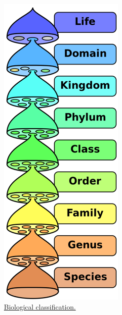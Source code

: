 \begin{figure}

{\centering \includegraphics[width=0.7\linewidth]{./figures/systematics/biological_classification} 

}

\caption{\href{https://commons.wikimedia.org/wiki/File:Biological_classification_L_Pengo_vflip.svg}{Biological classification.}}\label{fig:classification}
\end{figure}

